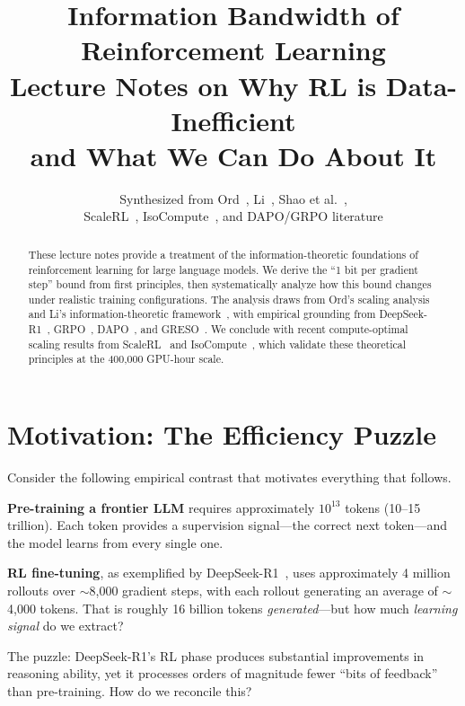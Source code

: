 \documentclass[11pt,a4paper]{article}
\title{\textbf{Information Bandwidth of Reinforcement Learning}\\[0.5em]\Large Lecture Notes on Why RL is Data-Inefficient\\and What We Can Do About It}
\author{Synthesized from Ord~\cite{ord2025}, Li~\cite{li2025info}, Shao et al.~\cite{deepseekmath},\\ScaleRL~\cite{scalerl2025}, IsoCompute~\cite{isocompute2025}, and DAPO/GRPO literature}
\date{}
\theoremstyle{definition}
\theoremstyle{remark}
\begin{document}
\maketitle

\vspace{1em}
\begin{abstract}
These lecture notes provide a treatment of the information-theoretic foundations of reinforcement learning for large language models. We derive the ``1 bit per gradient step'' bound from first principles, then systematically analyze how this bound changes under realistic training configurations. The analysis draws from Ord's scaling analysis~\cite{ord2025} and Li's information-theoretic framework~\cite{li2025info}, with empirical grounding from DeepSeek-R1~\cite{deepseekr1}, GRPO~\cite{deepseekmath}, DAPO~\cite{dapo2025}, and GRESO~\cite{greso2025}. We conclude with recent compute-optimal scaling results from ScaleRL~\cite{scalerl2025} and IsoCompute~\cite{isocompute2025}, which validate these theoretical principles at the 400,000 GPU-hour scale.
\end{abstract}

\vspace{2em}

\section{Motivation: The Efficiency Puzzle}

Consider the following empirical contrast that motivates everything that follows.

\textbf{Pre-training a frontier LLM} requires approximately $10^{13}$ tokens (10--15 trillion). Each token provides a supervision signal---the correct next token---and the model learns from every single one.

\textbf{RL fine-tuning}, as exemplified by DeepSeek-R1~\cite{deepseekr1}, uses approximately 4 million rollouts over $\sim$8,000 gradient steps, with each rollout generating an average of $\sim$4,000 tokens. That is roughly 16 billion tokens \emph{generated}---but how much \emph{learning signal} do we extract?

The puzzle: DeepSeek-R1's RL phase produces substantial improvements in reasoning ability, yet it processes orders of magnitude fewer ``bits of feedback'' than pre-training. How do we reconcile this?
\end{document}
